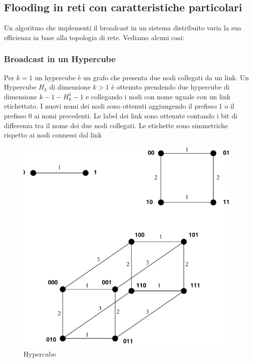 \documentclass[12pt]{article}
\begin{document}
		
	\subsection{Flooding in reti con caratteristiche particolari}
		Un algoritmo che implementi il broadcast in un sistema distribuito varia la sua efficienza in base alla topologia di rete. Vediamo alcuni casi:
		\subsubsection{Broadcast in un Hypercube}
			Per $k=1$ un hypercube è un grafo che presenta due nodi collegati da un link.
			Un Hypercube $H_k$ di dimensione $k>1$ è ottenuto prendendo due hypercube di dimensione $k-1-H^{1}_k-1$ e collegando i nodi con nome uguale con un link etichettato. I nuovi nomi dei nodi sono ottenuti aggiungendo il prefisso 1 o il prefisso 0 ai nomi precedenti. Le label dei link sono ottenute contando i bit di differenza tra il nome dei due nodi collegati. Le etichette sono simmetriche rispetto ai nodi connessi dal link\\
			\begin{figure}[h!]
				\centering
				\includegraphics[scale=0.35]{img/hyper.png}
				\caption{Hypercube}
			\end{figure}
\end{document}
